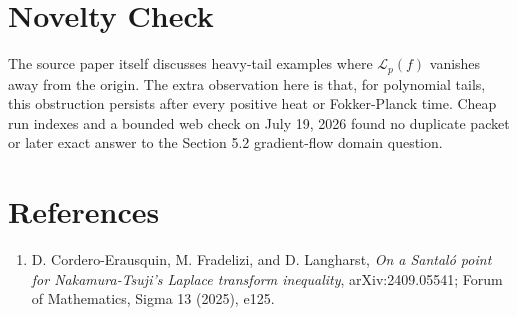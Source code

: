 \documentclass[11pt]{article}
\newcommand{\lap}{\mathcal L_p}
\begin{document}
\section*{Novelty Check}

The source paper itself discusses heavy-tail examples where $\lap(f)$ vanishes
away from the origin. The extra observation here is that, for polynomial tails,
this obstruction persists after every positive heat or Fokker-Planck time.
Cheap run indexes and a bounded web check on July 19, 2026 found no duplicate
packet or later exact answer to the Section 5.2 gradient-flow domain question.

\section*{References}

\begin{enumerate}
\item D. Cordero-Erausquin, M. Fradelizi, and D. Langharst,
\emph{On a Santaló point for Nakamura-Tsuji's Laplace transform inequality},
arXiv:2409.05541; Forum of Mathematics, Sigma 13 (2025), e125.
\end{enumerate}
\end{document}
